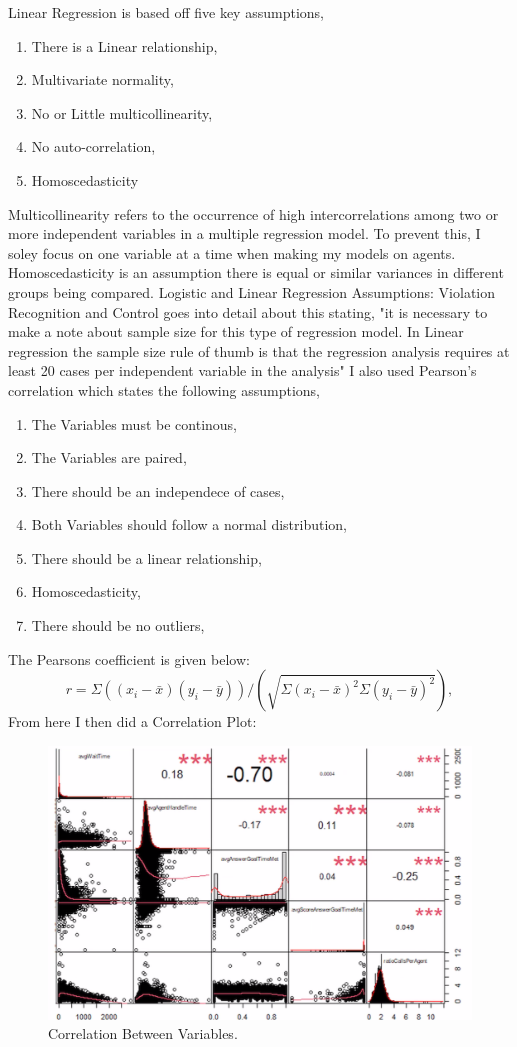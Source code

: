 \documentclass[12pt]{article}
\begin{document}
  Linear Regression is based off five key assumptions,
  \begin{enumerate}
  \item There is a Linear relationship,
  \item Multivariate normality,
  \item No or Little multicollinearity,
  \item No auto-correlation,
  \item Homoscedasticity
\end{enumerate} Multicollinearity refers to the occurrence of high intercorrelations among two or more independent variables in a multiple regression model.
To prevent this, I soley focus on one variable at a time when making my models on agents. Homoscedasticity is an assumption there is equal or similar variances in different groups being compared.
Logistic and Linear Regression Assumptions: Violation Recognition and Control goes into detail about this stating, "it is necessary to make a note about sample size for this type of regression model. In Linear
regression the sample size rule of thumb is that the regression analysis requires at least 20 cases per
independent variable in the analysis"\citep{schreiber2018logistic} 
I also used Pearson's correlation which states the following assumptions,
\begin{enumerate}
  \item The Variables must be continous,
  \item The Variables are paired,
  \item There should be an independece of cases,
  \item Both Variables should follow a normal distribution,
  \item There should be a linear relationship,
  \item Homoscedasticity,
  \item There should be no outliers,
\end{enumerate}
The Pearsons coefficient is given below:
\begin{equation}
  \label{eq:Pearson}
r= \Sigma((x_i - \bar{x})(y_i-\bar{y}))/(\sqrt{\Sigma{(x_i-\bar{x})^2}\Sigma{(y_i-\bar{y})^2}}),
\end{equation}
From here I then did a Correlation Plot:
\begin{figure}[H]
  \centering
  \includegraphics[width=\textwidth]{Correlation.png}
  \caption{Correlation Between Variables.}
  \label{fig:Correlation}
\end{figure}
\end{document}
